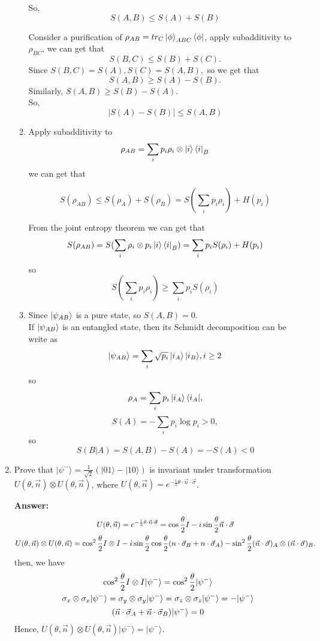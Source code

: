 \documentclass[english,aps,onecolumn]{revtex4-1}
\begin{document}
\begin{enumerate}[1.]
\begin{enumerate}[(1)]
    So,
     $$S(A,B) \leq S(A)+S(B)$$

    Consider a purification of $\rho_{AB} = tr_C \ket{\phi}_{ABC} \bra{\phi}$,
    apply subadditivity to $\rho_{BC}$, we can get that
    $$ S(B,C) \leq S(B)+S(C).$$
    Since $S(B,C)=S(A), S(C)=S(A,B),$ so we get that
    $$ S(A,B) \geq S(A) - S(B).$$
    Similarly, $S(A,B) \geq S(B) - S(A).$\\
    So,  $$|S(A)-S(B)| \leq S(A,B)$$

    \item
     Apply subadditivity to
     $$\rho_{AB} = \sum_i {p_i \rho_i \otimes \ket{i}\bra{i}_B}$$
     we can get that

     $$
     S(\rho_{AB}) \leq S(\rho_A) + S(\rho_B) = S(\sum_i p_i \rho_i) + H(p_i)
     $$

     From the joint entropy theorem we can get that
     $$
     S(\rho_{AB}) = S(\sum_i {\rho_i \otimes p_i \ket{i}\bra{i}_B})
             = \sum_i p_i S(\rho_i) +H(p_i)
     $$
    so
    $$S(\sum_i{p_i \rho_i}) \geq \sum_i{p_i S(\rho_i)}$$

    \item
    Since $\ket{\psi_{AB}}$  is a pure state, so $S(A,B) = 0.$\\
    If $\ket{\psi_{AB}}$ is an entangled state, then its Schmidt decomposition can be write as
    $$\ket{\psi_{AB}}=\sum_i{\sqrt{p_i}\ket{i_A}\ket{i_B}}, i \geq 2$$
    so $$\rho_A=\sum_i{p_i\ket{i_A}\bra{i_A}},$$
     $$S(A)=- \sum_i{p_i \log{p_i}}>0,$$
    so $$S(B|A)=S(A,B)-S(A)=-S(A) < 0$$
	\end{enumerate}

\item
Prove that $|\psi^{-}\rangle=\frac{1}{\sqrt{2}}(|01\rangle-|10\rangle)$ is invariant under transformation $U(\theta,\vec{n})\otimes U(\theta,\vec{n})$, where $U(\theta,\vec{n})=e^{-\frac{i}{2}\theta\cdot\vec{n}\cdot\vec{\sigma}}$.

\textbf{Answer:}\\
\begin{gather}
U(\theta,\vec{n})=e^{-\frac{i}{2}\theta\cdot\vec{n}\cdot\vec{\sigma}}=\cos \frac{\theta}{2}I-i\sin \frac{\theta}{2}\vec{n}\cdot\vec{\sigma}\notag\\
U(\theta,\vec{n})\otimes U(\theta,\vec{n})=\cos^{2}\frac{\theta}{2}I\otimes I-i\sin \frac{\theta}{2}\cos \frac{\theta}{2}(n\cdot\vec{\sigma}_{B}+n\cdot\vec{\sigma}_{A})-\sin^{2}\frac{\theta}{2}(\vec{n}\cdot\vec{\sigma})_{A}\otimes (\vec{n}\cdot\vec{\sigma})_{B}.\notag
\end{gather}
then, we have
\begin{gather}
\cos^{2}\frac{\theta}{2}I\otimes I|\psi^{-}\rangle=\cos^{2}\frac{\theta}{2}|\psi^{-}\rangle\notag\\
\sigma_{x}\otimes\sigma_{x}|\psi^{-}\rangle=\sigma_{y}\otimes\sigma_{y}|\psi^{-}\rangle=\sigma_{z}\otimes\sigma_{z}|\psi^{-}\rangle=-|\psi^{-}\rangle\notag\\
(\vec{n}\cdot\vec{\sigma}_{A}+\vec{n}\cdot\vec{\sigma}_{B})|\psi^{-}\rangle=0\notag
\end{gather}
Hence, $U(\theta,\vec{n})\otimes U(\theta,\vec{n})|\psi^{-}\rangle=|\psi^{-}\rangle$.


\end{enumerate}
\end{document}
